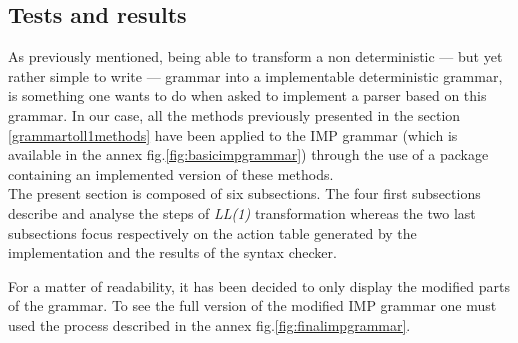 \documentclass[a4paper,11pt]{article}
\begin{document}
  \subsection{Tests and results}
    \label{sec:results}
    As previously mentioned, being able to transform a non deterministic --- but yet rather simple to write --- grammar into a implementable deterministic grammar, is something one wants to do when asked to implement a parser based on this grammar. In our case, all the methods previously presented in the section \ref{grammartoll1methods} have been applied to the IMP grammar (which is available in the annex fig.\ref{fig:basicimpgrammar}) through the use of a package containing an implemented version of these methods.\\
    The present section is composed of six subsections. The four first subsections describe and analyse the steps of \textit{LL(1)} transformation whereas the two last subsections focus respectively on the action table generated by the implementation and the results of the syntax checker.\\
    \begin{tcolorbox}
      For a matter of readability, it has been decided to only display the modified parts of the grammar. To see the full version of the modified IMP grammar one must used the process described in the annex fig.\ref{fig:finalimpgrammar}.
    \end{tcolorbox}
    
\end{document}
